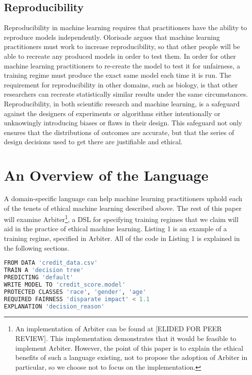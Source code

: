 \documentclass[letterpaper]{article}
\begin{document}
\subsection{Reproducibility}
Reproducibility in machine learning requires that practitioners have the ability to reproduce models independently. Olorisade  argues that machine learning practitioners must work to increase reproducibility, so that other people will be able to recreate any produced models in order to test them. In order for other machine learning practitioners to re-create the model to test it for unfairness, a training regime must produce the exact same model each time it is run. The requirement for reproducibility in other domains, such as biology, is that other researchers can recreate statistically similar results under the same circumstances. Reproducibility, in both scientific research and machine learning, is a safeguard against the designers of experiments or algorithms either intentionally or unknowingly introducing biases or flaws in their design. This safeguard not only ensures that the distributions of outcomes are accurate, but that the series of design decisions used to get there are justifiable and ethical. 

\section{An Overview of the Language}
A domain-specific language can help machine learning practitioners uphold each of the tenets of ethical machine learning described above. The rest of this paper will examine Arbiter\footnote{An implementation of Arbiter can be found at [ELIDED FOR PEER REVIEW]. This implementation demonstrates that it would be feasible to implement Arbiter. However, the point of this paper is to explain the ethical benefits of such a language existing, not to propose the adoption of Arbiter in particular, so we choose not to focus on the implementation.}, a DSL for specifying training regimes that we claim will aid in the practice of ethical machine learning. Listing 1 is an example of a training regime, specified in Arbiter. All of the code in Listing 1 is explained in the following sections.

\begin{lstlisting}[language=Python,caption=Arbiter example.]
FROM DATA 'credit_data.csv'
TRAIN A 'decision tree'
PREDICTING 'default'
WRITE MODEL TO 'credit_score.model'
PROTECTED CLASSES 'race', 'gender', 'age'
REQUIRED FAIRNESS 'disparate impact' < 1.1
EXPLANATION 'decision_reason'
\end{lstlisting}
\end{document}
